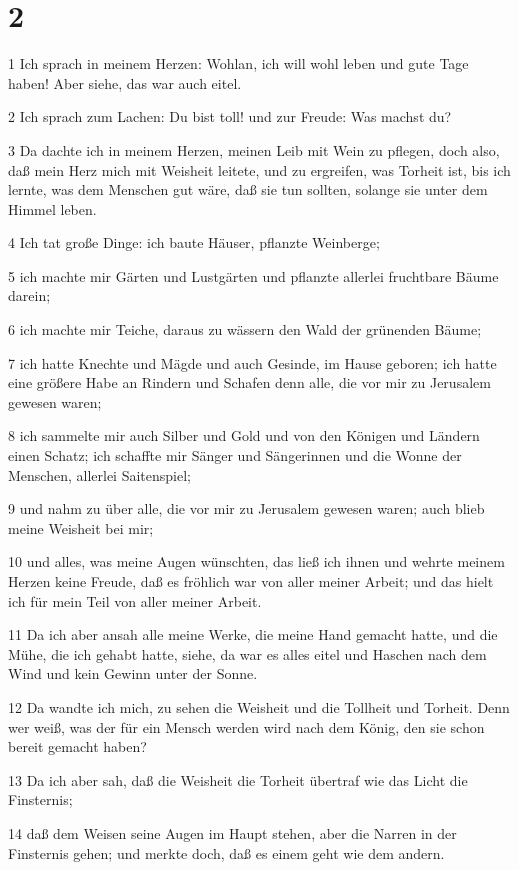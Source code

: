\chapter{2}

\par 1 Ich sprach in meinem Herzen: Wohlan, ich will wohl leben und gute Tage haben! Aber siehe, das war auch eitel.
\par 2 Ich sprach zum Lachen: Du bist toll! und zur Freude: Was machst du?
\par 3 Da dachte ich in meinem Herzen, meinen Leib mit Wein zu pflegen, doch also, daß mein Herz mich mit Weisheit leitete, und zu ergreifen, was Torheit ist, bis ich lernte, was dem Menschen gut wäre, daß sie tun sollten, solange sie unter dem Himmel leben.
\par 4 Ich tat große Dinge: ich baute Häuser, pflanzte Weinberge;
\par 5 ich machte mir Gärten und Lustgärten und pflanzte allerlei fruchtbare Bäume darein;
\par 6 ich machte mir Teiche, daraus zu wässern den Wald der grünenden Bäume;
\par 7 ich hatte Knechte und Mägde und auch Gesinde, im Hause geboren; ich hatte eine größere Habe an Rindern und Schafen denn alle, die vor mir zu Jerusalem gewesen waren;
\par 8 ich sammelte mir auch Silber und Gold und von den Königen und Ländern einen Schatz; ich schaffte mir Sänger und Sängerinnen und die Wonne der Menschen, allerlei Saitenspiel;
\par 9 und nahm zu über alle, die vor mir zu Jerusalem gewesen waren; auch blieb meine Weisheit bei mir;
\par 10 und alles, was meine Augen wünschten, das ließ ich ihnen und wehrte meinem Herzen keine Freude, daß es fröhlich war von aller meiner Arbeit; und das hielt ich für mein Teil von aller meiner Arbeit.
\par 11 Da ich aber ansah alle meine Werke, die meine Hand gemacht hatte, und die Mühe, die ich gehabt hatte, siehe, da war es alles eitel und Haschen nach dem Wind und kein Gewinn unter der Sonne.
\par 12 Da wandte ich mich, zu sehen die Weisheit und die Tollheit und Torheit. Denn wer weiß, was der für ein Mensch werden wird nach dem König, den sie schon bereit gemacht haben?
\par 13 Da ich aber sah, daß die Weisheit die Torheit übertraf wie das Licht die Finsternis;
\par 14 daß dem Weisen seine Augen im Haupt stehen, aber die Narren in der Finsternis gehen; und merkte doch, daß es einem geht wie dem andern.
